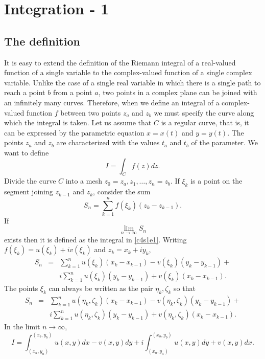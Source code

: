 \chapter{Integration - 1}\label{c4}
\section{The definition}\label{c4s1}
It is easy to extend the definition of the Riemann integral of a real-valued
function of a single variable to the complex-valued function of a single
complex variable. Unlike the case of a single real variable in which there
is a single path to reach a point $b$ from a point $a$, two points in a complex
plane can be joined with an infinitely many curves. Therefore, when we define
an integral of a complex-valued function $f$ between two points $z_a$ and
$z_b$ we must specify the curve along which the integral is taken. Let us assume
that $C$ is a regular curve, that is, it can be expressed by the parametric
equation $x = x(t)$ and $y = y(t)$. The points $z_a$ and $z_b$ are characterized
with the values $t_a$ and $t_b$ of the parameter. We want to define
\begin{equation}\label{c4s1e1}
I = \int_C f(z)dz.
\end{equation}
Divide the curve $C$ into a mesh $z_0 = z_a, z_1, \ldots, z_n = z_b$. If $\xi_k$
is a point on the segment joining $z_{k-1}$ and $z_k$, consider the sum
\begin{equation}\label{c4s1e2}
S_n = \sum_{k=1}^n f(\xi_k)(z_{k} - z_{k-1}).
\end{equation}
If 
\[
\lim_{n \rightarrow \infty}S_n
\]
exists then it is defined as the integral in \eqref{c4s1e1}. Writing
$f(\xi_k) = u(\xi_k) + iv(\xi_k)$ and $z_k = x_k + iy_k$,
\begin{eqnarray*}
S_n &=& \sum_{k=1}^n u(\xi_k)(x_k - x_{k-1}) - v(\xi_k)(y_k - y_{k-1}) + \\
 & & i\sum_{k=1}^n u(\xi_k)(y_k - y_{k-1}) + v(\xi_k)(x_k - x_{k-1}).
\end{eqnarray*}
The points $\xi_k$ can always be written as the pair $\eta_k, \zeta_k$ so that
\begin{eqnarray}
S_n &=& \sum_{k=1}^n u(\eta_k, \zeta_k)(x_k - x_{k-1}) - v(\eta_k, \zeta_k)
(y_k - y_{k-1}) + \nonumber \\
 & & i\sum_{k=1}^n u(\eta_k, \zeta_k)(y_k - y_{k-1}) + v(\eta_k, \zeta_k)
     (x_k - x_{k-1}).\label{c4s1e3}
\end{eqnarray}
In the limit $n \rightarrow \infty$,
\begin{equation}\label{c4s1e4}
I = \int_{(x_a,y_a)}^{(x_b,y_b)}u(x,y)dx - v(x,y)dy + 
i\int_{(x_a,y_a)}^{(x_b,y_b)}u(x,y)dy + v(x,y)dx.
\end{equation}
